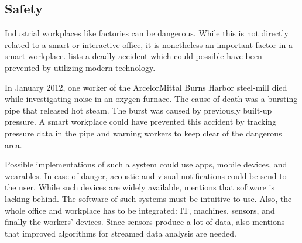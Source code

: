 \subsection{Safety}
Industrial workplaces like factories can be dangerous. While this is not directly related to a smart or interactive office, it is nonetheless an important factor in a smart workplace. \cite{sda-wired} lists a deadly accident which could possible have been prevented by utilizing modern technology.

In January 2012, one worker of the ArcelorMittal Burns Harbor steel-mill died while investigating noise in an oxygen furnace. The cause of death was a bursting pipe that released hot steam. The burst was caused by previously built-up pressure. A smart workplace could have prevented this accident by tracking pressure data in the pipe and warning workers to keep clear of the dangerous area.

Possible implementations of such a system could use apps, mobile devices, and wearables. In case of danger, acoustic and visual notifications could be send to the user. While such devices are widely available, \cite{sda-wired} mentions that software is lacking behind. The software of such systems must be intuitive to use. Also, the whole office and workplace has to be integrated: IT, machines, sensors, and finally the workers' devices. Since sensors produce a lot of data, \cite{sda-wired} also mentions that improved algorithms for streamed data analysis are needed.


